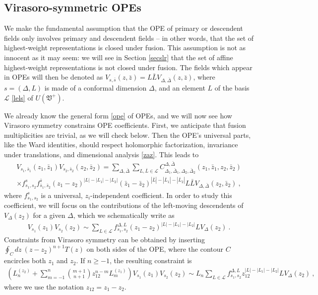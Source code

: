\documentclass[12pt, a4paper, notitlepage, twoside]{report}
\numberwithin{equation}{section}
\theoremstyle{break}
\begin{document}
\subsection{Virasoro-symmetric OPEs \label{secope}}

We make the fundamental assumption that the OPE of primary or descendent fields only involves primary and descendent fields -- in other words, that the set of highest-weight representations is closed under fusion. This assumption is not as innocent as it may seem: we will see in Section \ref{secslr} that the set of affine highest-weight representations is not closed under fusion. The fields which appear in OPEs will then be denoted as $V_{s,\bar{s}}(z,\bar{z}) = L\bar{L} V_{\Delta,\bar{\Delta}}(z,\bar{z})$, where $s=(\Delta,L)$ is made of a conformal dimension $\Delta$, and an element $L$ of the basis $\mathcal{L}$ \eqref{lels} of $U(\mathfrak{V}^+)$.

We already know the general form \eqref{ope} of OPEs, and we will now see how Virasoro symmetry constrains OPE coefficients. First, we anticipate that fusion multiplicities are trivial, as we will check below. Then the OPE's universal parts, like the Ward identities, should respect holomorphic factorization, invariance under translations, and dimensional analysis \eqref{zaz}. This leads to
\begin{multline}
 V_{s_1,\bar{s}_1}(z_1,\bar{z}_1)V_{s_2,\bar{s}_2}(z_2,\bar{z}_2) = \sum_{\Delta,\bar{\Delta}}\sum_{L,\bar{L}\in \mathcal{L}} 
 C_{\Delta_1,\bar{\Delta}_1,\Delta_2,\bar{\Delta}_2}^{\Delta,\bar{\Delta}}(z_1,\bar{z}_1,z_2,\bar{z}_2)
\\ \times
 f_{s_1,s_2}^{s} f_{\bar{s}_1,\bar{s}_2}^{\bar{s}} (z_1-z_2)^{|L|-|L_1|-|L_2|} (\bar{z}_1-\bar{z}_2)^{|\bar{L}|-|\bar{L}_1|-|\bar{L}_2|}
 L\bar{L} V_{\Delta,\bar{\Delta}}(z_2,\bar{z}_2) \ ,
\label{vvs}
\end{multline}
where $f_{s_1,s_2}^s$ is a universal, $z_i$-independent coefficient. In order to study this coefficient, we will focus on the contributions of the left-moving descendents of $V_\Delta(z_2)$ for a given $\Delta$, which we schematically write as
\begin{align}
 V_{s_1}(z_1)V_{s_2}(z_2) \sim \sum_{L\in \mathcal{L}} f_{s_1,s_2}^{\Delta,L} (z_1-z_2)^{|L|-|L_1|-|L_2|} LV_\Delta(z_2)\ .
\label{vvlv}
\end{align}
Constraints from Virasoro symmetry can be obtained by inserting $\oint_C dz\ (z-z_2)^{n+1} T(z)$ on both sides of the OPE, where the contour $C$ encircles both $z_1$ and $z_2$.
If $n\geq -1$, the resulting constraint is 
\begin{align}
 \left(L_n^{(z_2)}+\sum_{m=-1}^{n}\binom{m+1}{n+1} z_{12}^{n-m}L_{m}^{(z_1)}\right) V_{s_1}(z_1)V_{s_2}(z_2) \sim  L_n\sum_{L\in \mathcal{L}} f_{s_1,s_2}^{\Delta,L} z_{12}^{|L|-|L_1|-|L_2|}  LV_\Delta(z_2)\ ,
\label{zlzd}
\end{align}
where we use the notation $z_{12}=z_1-z_2$.
\end{document}
